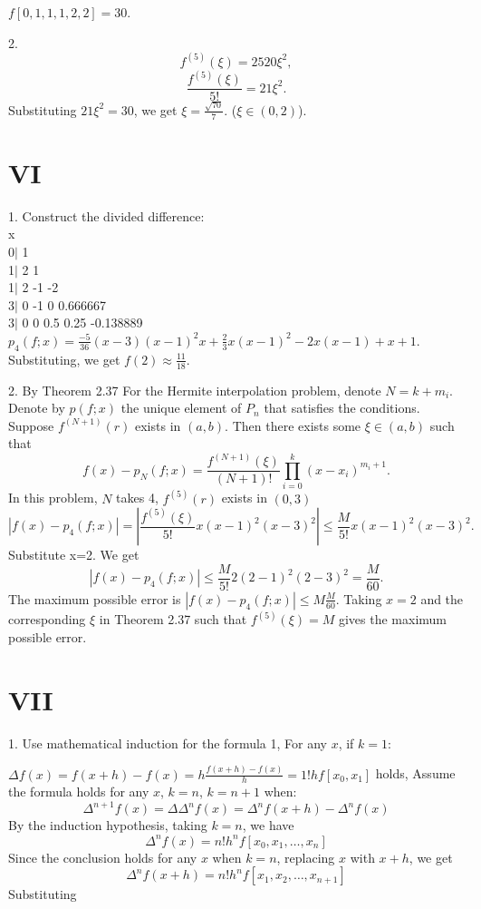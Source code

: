 \documentclass[a4paper]{article}
\begin{document}
\( f[0, 1, 1, 1, 2, 2] = 30 \).

2.
\[
f^{(5)}(\xi) = 2520 \xi^2,
\]
\[
\frac{f^{(5)}(\xi)}{5!} = 21 \xi^2.
\]
Substituting \( 21 \xi^2 = 30 \), we get \( \xi = \frac{\sqrt{70}}{7} \). (\(\xi \in (0,2) \)).

\section*{VI}
1.
Construct the divided difference:\\
  x\\
  0$|$ 1\\
  1$|$ 2 1\\
  1$|$ 2 -1 -2\\
  3$|$ 0 -1 0   0.666667\\
  3$|$ 0 0  0.5 0.25 -0.138889\\
\( p_4(f; x) = \frac{-5}{36}(x-3)(x-1)^2x + \frac{2}{3}x(x-1)^2 - 2x(x-1) + x + 
1 \).\\
Substituting, we get \( f(2) \approx \frac{11}{18} \).

2.
By Theorem 2.37
For the Hermite interpolation problem, denote \( N = k + m_i \). Denote by \( p(f; x) \) the unique element of \( P_n \) that satisfies the conditions. Suppose \( f^{(N+1)}(r) \) exists in \( (a, b) \). Then there exists some \( \xi \in (a, b) \) such that
\[
f(x) - p_N(f; x) = \frac{f^{(N+1)}(\xi)}{(N+1)!} \prod_{i=0}^k (x - x_i)^{m_i + 1}.
\]
In this problem, \( N \) takes 4, \( f^{(5)}(r) \) exists in \( (0, 3) \)
\[
|f(x) - p_4(f; x)| = \left| \frac{f^{(5)}(\xi)}{5!} x (x - 1)^2 (x-3)^2 \right| \leq \frac{M}{5!} x (x - 1)^2 (x-3)^2.
\]
Substitute x=2. We get 
\[
|f(x) - p_4(f; x)|  \leq \frac{M}{5!} 2 (2 - 1)^2 (2-3)^2=\frac{M}{60}.
\]
The maximum possible error is \( |f(x) - p_4(f; x)| \leq M \frac{M}{60} \). Taking \( x = 2 \) and the corresponding \( \xi \) in Theorem 2.37 such that \( f^{(5)}(\xi) = M \) gives the maximum possible error.

\section*{VII}
1. Use mathematical induction for the formula 1,
For any \( x \), if \( k = 1 \):

\(\Delta f(x) = f(x+h) - f(x) = h \frac{f(x+h) - f(x)}{h} = 1! h f[x_0, x_1] \) holds,
Assume the formula holds for any \( x \), \( k = n \), \( k = n + 1 \) when:
\[
\Delta^{n+1} f(x) = \Delta \Delta^n f(x) = \Delta^n f(x+h) - \Delta^n f(x)
\]
By the induction hypothesis, taking \( k = n \), we have
\[
\Delta^n f(x) = n! h^n f[x_0, x_1, \ldots, x_n]
\]
Since the conclusion holds for any \( x \) when \( k = n \), replacing \( x \) with \( x + h \), we get
\[
\Delta^n f(x+h) = n! h^n f[x_1, x_2, \ldots, x_{n+1}]
\]
Substituting
\end{document}
